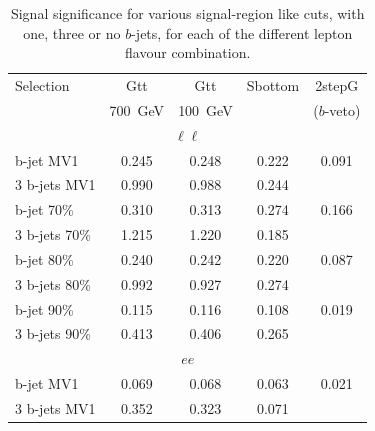 \begin{table}[h]
\caption{Signal significance for various signal-region like cuts, with one, three or no $b$-jets, for each of the different lepton flavour combination.}
\label{tab:btagging_significance_flavours}
\begin{center}{\scriptsize
          \begin{tabular}{l|cccc }     
            Selection     &    Gtt &    Gtt &    Sbottom & 2stepG \\               
                          & 700~GeV & 100~GeV &            &  ($b$-veto) \\ \hline \hline 
            \multicolumn{5}{c}{$\ell\ell$} \\ \hline        

            b-jet MV1     & 0.245 & 0.248 & 0.222 & 0.091 \\        
            3 b-jets MV1  & 0.990 & 0.988 & 0.244 &       \\\hline  
                                                                    
            b-jet  70\%   & 0.310 & 0.313 & 0.274 & 0.166 \\        
            3 b-jets 70\% & 1.215 & 1.220 & 0.185 &       \\\hline  
                                                                    
            b-jet 80\%    & 0.240 & 0.242 & 0.220 & 0.087 \\        
            3 b-jets 80\% & 0.992 & 0.927 & 0.274 &       \\\hline  
                                                                         
            b-jet 90\%    & 0.115 & 0.116 & 0.108 & 0.019 \\        
            3 b-jets 90\% & 0.413 & 0.406 & 0.265 &       \\\hline  
                                                                    
            \multicolumn{5}{c}{$ee$} \\ \hline        

            b-jet MV1     & 0.069 & 0.068 & 0.063 & 0.021 \\        
            3 b-jets MV1  & 0.352 & 0.323 & 0.071 &       \\\hline  
                                                                    

\end{tabular}}
\end{center}
\end{table}
